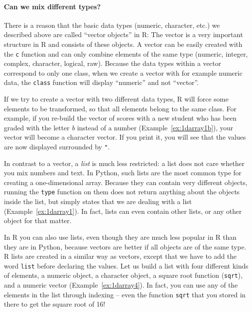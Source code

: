\paragraph[Can we mix different types?]{Can we mix different types?}
There is a reason that the basic data types (numeric, character, etc.) we described above are called
``vector objects'' in R: The vector is a very important structure in
R and consists of these objects. A vector can be easily created with the
\texttt{c} function and can only combine elements of the same type (numeric, integer, complex,
character, logical, raw).
Because the data types within a vector correspond to only one class,
when we create a vector with for example numeric data, the \texttt{class} function will display
``numeric'' and not ``vector''.

If we try to
create a vector with two different data types, R will 
force some elements to be transformed, so that all elements belong to the same
class. For example, if you re-build the vector of scores with a new student who has
been graded with the letter \emph{b} instead of a number (Example~\ref{ex:1darray1b}), your vector
will become a character vector. If you print it, you will see that the
values are now displayed surrounded by \verb|"|.




In contrast to a vector, a \emph{list} is much less restricted: a list does not care
whether you mix numbers and text. In Python, such lists are the most common type for creating
a one-dimensional array. Because they
can contain very different objects, running the \texttt{type} function on them
does not return anything about the objects inside the list, but simply states that we
are dealing with a list (Example~\ref{ex:1darray1}).
In fact, lists can even contain other lists, or any other object for
that matter.

In R you can also use lists, even though they are much less popular in R than
they are in Python, because vectors are better if all objects are of the same type.
R lists are created in a similar way as vectors, except that we have to add the word \verb|list|
before declaring the values. Let us build a list with four different
kinds of elements, a numeric object, a character object, a square root
function (\texttt{sqrt}), and a numeric vector (Example~\ref{ex:1darray4}). In fact, you
can use any of the elements in the list through indexing -- even the
function \texttt{sqrt} that you stored in there to get the square root of
16!

